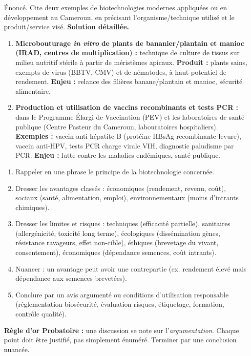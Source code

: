 \documentclass[11pt]{article}
\newcommand{\cle}[1]{{\popxbold\color{popdark}#1}}
\newcounter{popsec}
\newcounter{popsub}
\newcommand{\courssub}[1]{%
  \stepcounter{popsub}%
  \par\vspace{9pt}\noindent{\popxbold\fontsize{11.5}{13}\selectfont\color{popink}{\color{poporange}\thepopsec.\thepopsub}\hspace{6pt}#1}\par\nopagebreak\vspace{4pt}
}
\begin{document}
\begin{exoresolu}
Énoncé. Cite deux exemples de biotechnologies modernes appliquées ou en développement au Cameroun, en précisant l'organisme/technique utilisé et le produit/service visé.
\tcblower
\textbf{Solution détaillée.}
\begin{enumerate}
\item \textbf{Microbouturage \emph{in vitro} de plants de bananier/plantain et manioc (IRAD, centres de multiplication) :} technique de culture de tissus sur milieu nutritif stérile à partir de méristèmes apicaux. \textbf{Produit :} plants sains, exempts de virus (BBTV, CMV) et de nématodes, à haut potentiel de rendement. \textbf{Enjeu :} relance des filières banane/plantain et manioc, sécurité alimentaire.
\item \textbf{Production et utilisation de vaccins recombinants et tests PCR :} dans le Programme Élargi de Vaccination (PEV) et les laboratoires de santé publique (Centre Pasteur du Cameroun, labouratoires hospitaliers). \textbf{Exemples :} vaccin anti-hépatite B (protéine HBsAg recombinante levure), vaccin anti-HPV, tests PCR charge virale VIH, diagnostic paludisme par PCR. \textbf{Enjeu :} lutte contre les maladies endémiques, santé publique.
\end{enumerate}
\end{exoresolu}

\courssub{Avantages, limites et débats}

\begin{methode}
\begin{enumerate}
\item \cle{Rappeler en une phrase} le principe de la biotechnologie concernée.
\item Dresser les \cle{avantages} classés : économiques (rendement, revenu, coût), sociaux (santé, alimentation, emploi), environnementaux (moins d'intrants chimiques).
\item Dresser les \cle{limites et risques} : techniques (efficacité partielle), sanitaires (allergénicité, toxicité long terme), écologiques (dissémination gènes, résistance ravageurs, effet non-cible), éthiques (brevetage du vivant, consentement), économiques (dépendance semences, coût intrants).
\item \cle{Nuancer} : un avantage peut avoir une contrepartie (ex. rendement élevé mais dépendance aux semences brevetées).
\item Conclure par un \cle{avis argumenté} ou conditions d'utilisation responsable (réglementation biosécurité, évaluation risques, étiquetage, formation, contrôle qualité).
\end{enumerate}
\textbf{Règle d'or Probatoire :} une discussion se note sur l'\emph{argumentation}. Chaque point doit être justifié, pas simplement énuméré. Terminer par une conclusion nuancée.
\end{methode}
\end{document}

